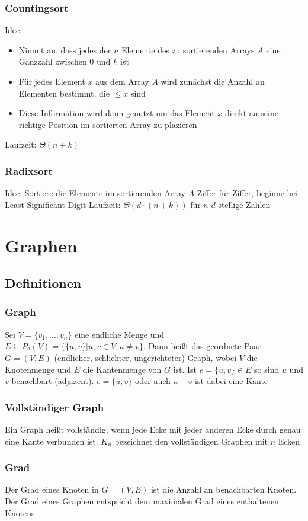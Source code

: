 \documentclass[a4paper]{article}
\begin{document}
	\subsubsection{Countingsort}
	Idee: 
	\begin{itemize}
	  \item Nimmt an, dass jedes der $n$ Elemente des zu sortierenden Arrays $A$ eine Ganzzahl zwischen $0$ und $k$ ist
	  \item Für jedes Element $x$ aus dem Array $A$ wird zunächst die Anzahl an Elementen bestimmt, die $\leq x$ sind
	  \item Diese Information wird dann genutzt um das Element $x$ direkt an seine richtige Position im sortierten Array zu plazieren
	\end{itemize}
	Laufzeit: $\Theta(n+k)$
	\subsubsection{Radixsort}
	Idee: Sortiere die Elemente im sortierenden Array $A$ Ziffer für Ziffer, beginne bei Least Significant Digit \newline \newline
	Laufzeit: $\Theta(d\cdot(n+k))$ für $n$ $d$-stellige Zahlen
	\section{Graphen}
	\subsection{Definitionen}
	\subsubsection{Graph}
		Sei $V=\{v_1,...,v_n\}$ eine endliche Menge und $E\subseteq P_2(V)=\{\{u,v\}|u,v\in V,u\not = v\}$. Dann heißt das geordnete Paar $G=(V,E)$ (endlicher, schlichter, ungerichteter) Graph, wobei $V$ die Knotenmenge und $E$ die Kantenmenge von $G$ ist. Ist $e=\{u,v\}\in E$ so sind $u$ und $v$ benachbart (adjazent). $e=\{u,v\}$ oder auch $u-v$ ist dabei eine Kante 
	\subsubsection{Vollständiger Graph}
		Ein Graph heißt vollständig, wenn jede Ecke mit jeder anderen Ecke durch genau eine Kante verbunden ist. $K_n$ bezeichnet den vollständigen Graphen mit $n$ Ecken
	\subsubsection{Grad}
		Der Grad eines Knoten in $G=(V,E)$ ist die Anzahl an benachbarten Knoten. Der Grad eines Graphen entspricht dem maximalen Grad eines enthaltenen Knotens
\end{document}

